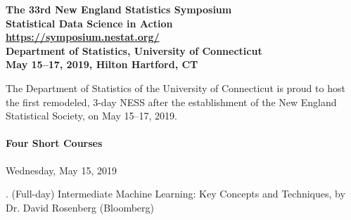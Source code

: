 \documentclass[12pt]{article}
\begin{document}
\pagestyle{empty}


\noindent{}%
\begin{minipage}[m]{5.5in}
\begin{center}
{\bf\Large  The 33rd New England Statistics Symposium\\[8pt]
 Statistical Data Science in Action}\\[8pt]
{\bf\large \url{https://symposium.nestat.org/}}\\[8pt]
{\bf\large Department of Statistics, University of Connecticut}\\[8pt]
{\bf May 15--17, 2019, Hilton Hartford, CT}
\end{center}
\end{minipage}

\bigskip
The Department of Statistics of the University of Connecticut is proud to host the first remodeled, 3-day NESS after the establishment of the New England Statistical Society, on May 15–17, 2019.

\paragraph{Four Short Courses} Wednesday, May 15, 2019

. (Full-day) Intermediate Machine Learning: Key Concepts and Techniques, by Dr. David Rosenberg (Bloomberg)
\end{document}
